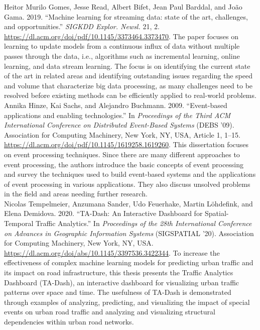 \documentclass[12pt]{article}
\begin{document}
Heitor Murilo Gomes, Jesse Read, Albert Bifet, Jean Paul Barddal, and João Gama. 2019. ``Machine learning for streaming data: state of the art, challenges, and opportunities.'' {\it SIGKDD Explor. Newsl.} 21, 2.
\url{https://dl.acm.org/doi/pdf/10.1145/3373464.3373470}.
The paper focuses on learning to update models from a continuous influx of data without multiple passes through the data, i.e., algorithms such as incremental learning, online learning, and data stream learning. The focus is on identifying the current state of the art in related areas and identifying outstanding issues regarding the speed and volume that characterize big data processing, as many challenges need to be resolved before existing methods can be efficiently applied to real-world problems. \\

Annika Hinze, Kai Sachs, and Alejandro Buchmann. 2009. ``Event-based applications and enabling technologies.'' In {\it Proceedings of the Third ACM International Conference on Distributed Event-Based Systems} (DEBS '09). Association for Computing Machinery, New York, NY, USA, Article 1, 1–15. \url{https://dl.acm.org/doi/pdf/10.1145/1619258.1619260}.
This dissertation focuses on event processing techniques. Since there are many different approaches to event processing, the authors introduce the basic concepts of event processing and survey the techniques used to build event-based systems and the applications of event processing in various applications. They also discuss unsolved problems in the field and areas needing further research. \\



Nicolas Tempelmeier, Anzumana Sander, Udo Feuerhake, Martin Löhdefink, and Elena Demidova. 2020. ``TA-Dash: An Interactive Dashboard for Spatial-Temporal Traffic Analytics.''
In {\it Proceedings of the 28th International Conference on Advances in Geographic Information Systems} (SIGSPATIAL '20). Association for Computing Machinery, New York, NY, USA.
\url{https://dl.acm.org/doi/abs/10.1145/3397536.3422344}.
To increase the effectiveness of complex machine learning models for predicting urban traffic and its impact on road infrastructure, this thesis presents the Traffic Analytics Dashboard (TA-Dash), an interactive dashboard for visualizing urban traffic patterns over space and time. The usefulness of TA-Dash is demonstrated through examples of analyzing, predicting, and visualizing the impact of special events on urban road traffic and analyzing and visualizing structural dependencies within urban road networks.
\end{document}
